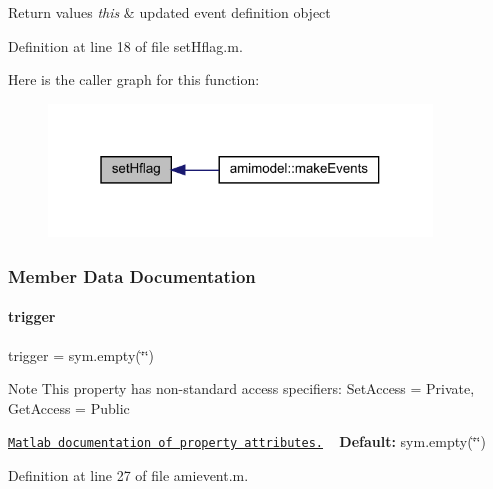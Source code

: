 \begin{DoxyRetVals}{Return values}
{\em this} & updated event definition object \\
\hline
\end{DoxyRetVals}


Definition at line 18 of file set\+Hflag.\+m.

Here is the caller graph for this function\+:
\nopagebreak
\begin{figure}[H]
\begin{center}
\leavevmode
\includegraphics[width=289pt]{classamievent_aef1933f186f69e58e2aa1b00d01f75e7_icgraph}
\end{center}
\end{figure}


\subsubsection{Member Data Documentation}
\mbox{\label{classamievent_ae194cb817eae4085f8023885100c68dd}} 
\paragraph{\texorpdfstring{trigger}{trigger}}
{\footnotesize\ttfamily trigger = sym.\+empty(\char`\"{}\char`\"{})}

\begin{DoxyNote}{Note}
This property has non-\/standard access specifiers\+: {\ttfamily Set\+Access = Private, Get\+Access = Public} 

\href{http://www.mathworks.com/help/matlab/matlab_oop/property-attributes.html}{\tt Matlab documentation of property attributes.} ~\newline
{\bfseries Default\+:} sym.\+empty(\char`\"{}\char`\"{}) 
\end{DoxyNote}


Definition at line 27 of file amievent.\+m.

\mbox{\label{classamievent_ab9227561ac246ee4b70f9e65c25ffda7}} 
